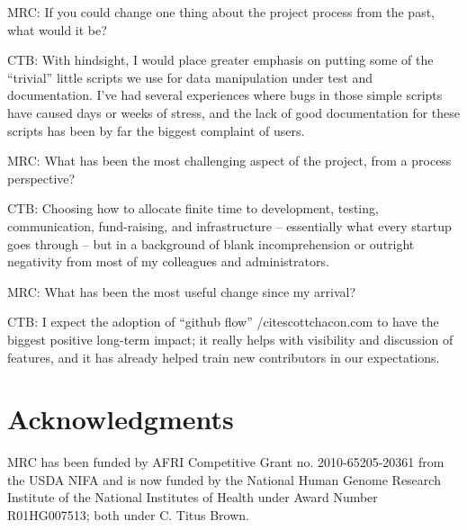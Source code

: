 \documentclass[11pt]{article}
\begin{document}
MRC: If you could change one thing about the project process from the
past, what would it be?

CTB: With hindsight, I would place greater emphasis on putting some of
the ``trivial'' little scripts we use for data manipulation under test
and documentation.  I've had several experiences where bugs in those
simple scripts have caused days or weeks of stress, and the lack of
good documentation for these scripts has been by far the biggest
complaint of users.

MRC: What has been the most challenging aspect of the project, from a
process perspective?

CTB: Choosing how to allocate finite time to development, testing,
communication, fund-raising, and infrastructure -- essentially what
every startup goes through -- but in a background of blank
incomprehension or outright negativity from most of my colleagues
and administrators.

MRC: What has been the most useful change since my arrival?

CTB: I expect the adoption of ``github flow'' /cite{scottchacon.com} to have
the biggest positive long-term impact; it really helps with visibility and
discussion of features, and it has already helped train new contributors in our
expectations.



\section*{Acknowledgments}

MRC has been funded by AFRI Competitive Grant no. 2010-65205-20361
from the USDA NIFA and is now funded by the National Human Genome
Research Institute of the National Institutes of Health under Award
Number R01HG007513; both under C. Titus Brown.








\end{document}
